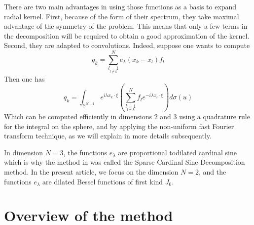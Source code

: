 \documentclass[11pt,a4paper]{article}
\begin{document}
There are two main advantages in using those functions as a basis to expand radial kernel. First, because of the form of their spectrum, they take maximal advantage of the symmetry of the problem. This means that only a few terms in the decomposition will be required to obtain a good approximation of the kernel. Second, they are adapted to convolutions. Indeed, suppose one wants to compute 
\[ q_k = \sum_{\underset{l\neq k}{l=1}}^N e_\lambda(x_k - x_l)f_l \]
Then one has 
\[ q_k = \int_{\mathbb{S}^{N-1}} e^{i\lambda x_k \cdot  \xi} \left(\sum_{\underset{l\neq k}{l=1}}^N  f_l e^{-i\lambda x_l \cdot \xi}\right)d\sigma(u)\]
Which can be computed efficiently in dimensions $2$ and $3$ using a quadrature rule for the integral on the sphere, and by applying the non-uniform fast Fourier transform technique, as we will explain in more details subsequently.

In dimension $N=3$, the functions $e_\lambda$ are proportional todilated cardinal sine which is why the method in \cite{Alouges2015} was called the Sparse Cardinal Sine Decomposition method. In the present article, we focus on the dimension $N=2$, and the functions $e_\lambda$ are dilated Bessel functions of first kind $J_0$. 

\section*{Overview of the method}
\end{document}
